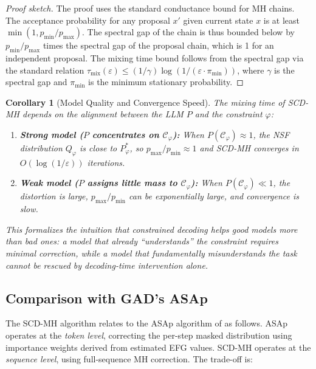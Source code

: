 \documentclass[twoside,11pt]{article}
\newtheorem{corollary}[theorem]{Corollary}
\newcommand{\Constraint}{\mathcal{C}}
\begin{document}
\begin{proof}[Proof sketch]
The proof uses the standard conductance bound for MH chains. The acceptance
probability for any proposal $x'$ given current state $x$ is at least
$\min(1, p_{\min}/p_{\max})$. The spectral gap of the chain is thus bounded
below by $p_{\min}/p_{\max}$ times the spectral gap of the proposal chain,
which is 1 for an independent proposal. The mixing time bound follows from
the spectral gap via the standard relation $\tau_{\mathrm{mix}}(\varepsilon)
\leq (1/\gamma) \log(1/(\varepsilon \cdot \pi_{\min}))$, where $\gamma$ is
the spectral gap and $\pi_{\min}$ is the minimum stationary probability.
\end{proof}

\begin{corollary}[Model Quality and Convergence Speed]
\label{cor:model-quality}
The mixing time of SCD-MH depends on the alignment between the LLM $P$ and
the constraint $\varphi$:
\begin{enumerate}
    \item \textbf{Strong model ($P$ concentrates on $\Constraint_\varphi$):}
    When $P(\Constraint_\varphi) \approx 1$, the NSF distribution
    $Q_\varphi$ is close to $P^*_\varphi$, so $p_{\max}/p_{\min} \approx 1$
    and SCD-MH converges in $O(\log(1/\varepsilon))$ iterations.

    \item \textbf{Weak model ($P$ assigns little mass to
    $\Constraint_\varphi$):} When $P(\Constraint_\varphi) \ll 1$, the
    distortion is large, $p_{\max}/p_{\min}$ can be exponentially large,
    and convergence is slow.
\end{enumerate}
This formalizes the intuition that constrained decoding helps good models
more than bad ones: a model that already ``understands'' the constraint
requires minimal correction, while a model that fundamentally misunderstands
the task cannot be rescued by decoding-time intervention alone.
\end{corollary}

\subsection{Comparison with GAD's ASAp}
\label{sec:comparison-asap}

The SCD-MH algorithm relates to the ASAp algorithm of \citet{ugare2024gad}
as follows. ASAp operates at the \emph{token level}, correcting the per-step
masked distribution using importance weights derived from estimated EFG
values. SCD-MH operates at the \emph{sequence level}, using full-sequence MH
correction. The trade-off is:
\end{document}
